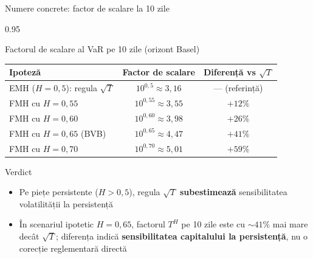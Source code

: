 \documentclass[9pt, aspectratio=169, t]{beamer}
\begin{document}
\begin{frame}[shrink=15]{Numere concrete: factor de scalare la 10 zile}
\begin{cminipage}{0.95\textwidth}
\begin{block}{Factorul de scalare al VaR pe 10 zile (orizont Basel)}
\renewcommand{\arraystretch}{1.25}
\centering
\begin{tabular}{lcc}
\toprule
\textbf{Ipoteză} & \textbf{Factor de scalare} & \textbf{Diferență vs $\sqrt T$} \\
\midrule
EMH ($H=0{,}5$): regula $\sqrt T$ & $10^{0{,}5}\approx 3{,}16$ & --- (referință) \\
FMH cu $H=0{,}55$ & $10^{0{,}55}\approx 3{,}55$ & $+12\%$ \\
FMH cu $H=0{,}60$ & $10^{0{,}60}\approx 3{,}98$ & $+26\%$ \\
FMH cu $H=0{,}65$ (BVB) & $10^{0{,}65}\approx 4{,}47$ & $+41\%$ \\
FMH cu $H=0{,}70$ & $10^{0{,}70}\approx 5{,}01$ & $+59\%$ \\
\bottomrule
\end{tabular}
\end{block}
\begin{alertblock}{Verdict}
\begin{itemize}\setlength{\itemsep}{0pt}
    \item Pe piețe persistente ($H>0{,}5$), regula $\sqrt T$ \textbf{subestimează} sensibilitatea volatilității la persistență
    \item În scenariul ipotetic $H=0{,}65$, factorul $T^H$ pe 10 zile este cu $\sim 41\%$ mai mare decât $\sqrt T$; diferența indică \textbf{sensibilitatea capitalului la persistență}, nu o corecție reglementară directă
\end{itemize}
\end{alertblock}
\end{cminipage}
\end{frame}
\end{document}
